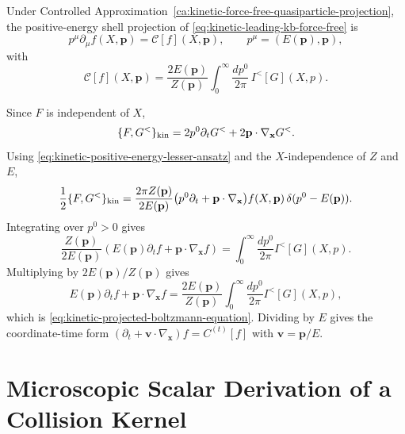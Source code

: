 \begin{remark}
\label{rem:kinetic-quasiparticle-drift-projection}
Under
Controlled Approximation~\ref{ca:kinetic-force-free-quasiparticle-projection},
the positive-energy shell projection of
\eqref{eq:kinetic-leading-kb-force-free} is
\begin{equation}
  p^\mu\partial_\mu f(X,\mathbf p)=\mathcal C[f](X,\mathbf p),
  \qquad
  p^\mu=(E(\mathbf p),\mathbf p),
  \label{eq:kinetic-projected-boltzmann-equation}
\end{equation}
with
\begin{equation}
  \mathcal C[f](X,\mathbf p)
  =
  \frac{2E(\mathbf p)}{Z(\mathbf p)}
  \int_0^\infty\frac{dp^0}{2\pi}\,I^<[G](X,p).
  \label{eq:kinetic-projected-collision-functional}
\end{equation}

Since \(F\) is independent of \(X\),
\begin{equation}
  \{F,G^<\}_{\rm kin}
  =
  2p^0\partial_tG^<
  +2\mathbf p\cdot\nabla_{\mathbf x}G^< .
  \label{eq:kinetic-free-bracket}
\end{equation}
Using \eqref{eq:kinetic-positive-energy-lesser-ansatz} and the
\(X\)-independence of \(Z\) and \(E\),
\begin{equation}
  \frac12\{F,G^<\}_{\rm kin}
  =
  \frac{2\pi Z(\mathbf p)}{2E(\mathbf p)}
  \bigl(p^0\partial_t+\mathbf p\cdot\nabla_{\mathbf x}\bigr)
  f(X,\mathbf p)\,\delta(p^0-E(\mathbf p)).
  \label{eq:kinetic-projected-bracket-before-integral}
\end{equation}
Integrating over \(p^0>0\) gives
\[
  \frac{Z(\mathbf p)}{2E(\mathbf p)}
  \left(E(\mathbf p)\partial_tf+\mathbf p\cdot\nabla_{\mathbf x}f\right)
  =
  \int_0^\infty\frac{dp^0}{2\pi}I^<[G](X,p).
\]
Multiplying by \(2E(\mathbf p)/Z(\mathbf p)\) gives
\begin{equation}
  E(\mathbf p)\partial_tf+\mathbf p\cdot\nabla_{\mathbf x}f
  =
  \frac{2E(\mathbf p)}{Z(\mathbf p)}
  \int_0^\infty\frac{dp^0}{2\pi}I^<[G](X,p),
  \label{eq:kinetic-projected-bracket-after-integral}
\end{equation}
which is \eqref{eq:kinetic-projected-boltzmann-equation}.  Dividing by
\(E\) gives the coordinate-time form
\((\partial_t+\mathbf v\cdot\nabla_{\mathbf x})f=C^{(t)}[f]\) with
\(\mathbf v=\mathbf p/E\).
\end{remark}

\section{Microscopic Scalar Derivation of a Collision Kernel}
\label{sec:kinetic-scalar-sk-collision-kernel}

